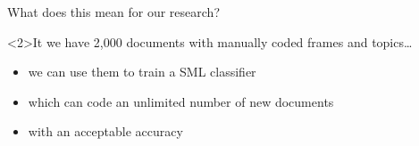 \documentclass{beamer}
\begin{document}
\begin{frame}[plain]
\begin{columns}[]
				
			\end{columns}
			
		\end{frame}
		
		
		
		
		
		\begin{frame}{What does this mean for our research?}
			\begin{block}<2>{It we have 2,000 documents with manually coded frames and topics\ldots}
				\begin{itemize}
					\item we can use them to train a SML classifier
					\item which can code an unlimited number of new documents
					\item with an acceptable accuracy
				\end{itemize}
			\end{block}
		\end{frame}
		
		
\end{document}

